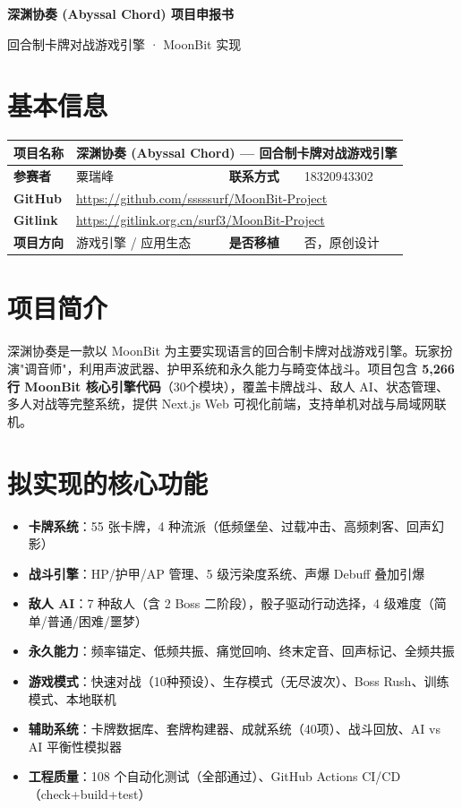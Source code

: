 \documentclass[10pt,a4paper]{article}
\begin{document}
\begin{center}
{\Large\bfseries\color{purpledark} 深渊协奏 (Abyssal Chord) 项目申报书}

\vspace{2pt}
{\small 回合制卡牌对战游戏引擎 · MoonBit 实现}
\end{center}
\vspace{6pt}

\section{基本信息}
\renewcommand{\arraystretch}{1.1}
\begin{tabularx}{\textwidth}{|l|X|l|X|}\hline
\rowcolor{purplelight} \textbf{项目名称} & \multicolumn{3}{l|}{深渊协奏 (Abyssal Chord) — 回合制卡牌对战游戏引擎} \\\hline
\textbf{参赛者}   & 粟瑞峰 & \textbf{联系方式} & 18320943302 \\\hline
\textbf{GitHub}   & \multicolumn{3}{l|}{\url{https://github.com/sssssurf/MoonBit-Project}} \\\hline
\textbf{Gitlink}  & \multicolumn{3}{l|}{\url{https://gitlink.org.cn/surf3/MoonBit-Project}} \\\hline
\textbf{项目方向} & 游戏引擎 / 应用生态 & \textbf{是否移植} & 否，原创设计 \\\hline
\end{tabularx}

\section{项目简介}
深渊协奏是一款以 MoonBit 为主要实现语言的回合制卡牌对战游戏引擎。玩家扮演"调音师"，利用声波武器、护甲系统和永久能力与畸变体战斗。项目包含 \textbf{5,266 行 MoonBit 核心引擎代码}（30个模块），覆盖卡牌战斗、敌人 AI、状态管理、多人对战等完整系统，提供 Next.js Web 可视化前端，支持单机对战与局域网联机。

\section{拟实现的核心功能}
\begin{itemize}[leftmargin=*,nosep]
  \item \textbf{卡牌系统}：55 张卡牌，4 种流派（低频堡垒、过载冲击、高频刺客、回声幻影）
  \item \textbf{战斗引擎}：HP/护甲/AP 管理、5 级污染度系统、声爆 Debuff 叠加引爆
  \item \textbf{敌人 AI}：7 种敌人（含 2 Boss 二阶段），骰子驱动行动选择，4 级难度（简单/普通/困难/噩梦）
  \item \textbf{永久能力}：频率锚定、低频共振、痛觉回响、终末定音、回声标记、全频共振
  \item \textbf{游戏模式}：快速对战（10种预设）、生存模式（无尽波次）、Boss Rush、训练模式、本地联机
  \item \textbf{辅助系统}：卡牌数据库、套牌构建器、成就系统（40项）、战斗回放、AI vs AI 平衡性模拟器
  \item \textbf{工程质量}：108 个自动化测试（全部通过）、GitHub Actions CI/CD（check+build+test）
\end{itemize}
\end{document}
